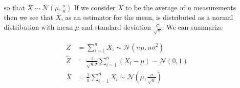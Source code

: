 \documentclass[12pt]{article}
\begin{document}
so that $\bar{X} \sim \mathcal{N}\left(\mu, \frac{\sigma}{n}\right)$ If we consider $\bar{X}$ to be the average of $n$ measurements then we see that $\bar{X}$, as an estimator for the mean, is distributed as a normal distribution with mean $\mu$ and standard deviation $\frac{\sigma}{\sqrt{n}}$. We can summarize

\begin{align}
Z &= \sum_{i=1}^n X_i \sim \mathcal{N}(n\mu, n \sigma^2)\\
\tilde{Z} &= \frac{1}{\sqrt{n} \sigma}\sum_{i=1}^n \left(X_i - \mu \right) \sim \mathcal{N}(0,1)\\
\bar{X} &= \frac{1}{n} \sum_{i=1}^n X_i \sim \mathcal{N}\left(\mu, \frac{\sigma}{\sqrt{n}}\right)
\end{align}
\end{document}
